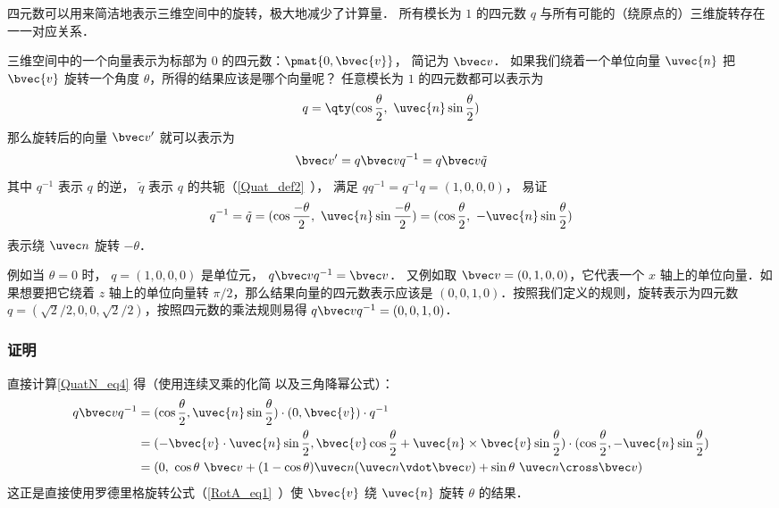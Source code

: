 

四元数可以用来简洁地表示三维空间中的旋转，极大地减少了计算量． 所有模长为 $1$ 的四元数 $q$ 与所有可能的（绕原点的）三维旋转存在一一对应关系．

三维空间中的一个向量表示为标部为 $0$ 的四元数：$\pmat{0, \bvec{v}}$， 简记为 $\bvec v$． 如果我们绕着一个单位向量 ${\uvec{n}}$ 把 $\bvec{v}$ 旋转一个角度 $\theta$，所得的结果应该是哪个向量呢？ 任意模长为 $1$ 的四元数都可以表示为
\begin{equation}
q = \qty(\cos{\frac{\theta}{2}},\ {\uvec{n}}\sin{\frac{\theta}{2}})
\end{equation}
那么旋转后的向量 $\bvec v'$ 就可以表示为
\begin{equation}\label{QuatN_eq4}
\bvec v' = q\bvec vq^{-1} = q\bvec v \tilde q
\end{equation}
其中 $q^{-1}$ 表示 $q$ 的逆， $\tilde q$ 表示 $q$ 的共轭（\autoref{Quat_def2}~）， 满足 $qq^{-1} = q^{-1}q = (1,0,0,0)$， 易证
\begin{equation}
q^{-1} = \tilde q = (\cos{\frac{-\theta}{2}},\ {\uvec{n}}\sin{\frac{-\theta}{2}})
= (\cos{\frac{\theta}{2}},\ -{\uvec{n}}\sin{\frac{\theta}{2}})
\end{equation}
表示绕 $\uvec n$ 旋转 $-\theta$．

例如当 $\theta = 0$ 时， $q = (1,0,0,0)$ 是单位元， $q\bvec vq^{-1} = \bvec v$． 又例如取 $\bvec v = (0, 1, 0, 0)$，它代表一个 $x$ 轴上的单位向量．如果想要把它绕着 $z$ 轴上的单位向量转 $\pi/2$，那么结果向量的四元数表示应该是 $(0, 0, 1, 0)$．按照我们定义的规则，旋转表示为四元数 $q=(\sqrt{2}/2, 0, 0, \sqrt{2}/2)$，按照四元数的乘法规则易得 $q\bvec v q^{-1}=(0,0,1,0)$．

\subsubsection{证明}
直接计算\autoref{QuatN_eq4} 得（使用连续叉乘的化简 以及三角降幂公式）：
\begin{equation}
\begin{aligned}
q\bvec vq^{-1}&= (\cos{\frac{\theta}{2}}, {\uvec{n}}\sin{\frac{\theta}{2}})\cdot (0, \bvec{v})\cdot q^{-1}\\&
=(-\bvec{v}\cdot {\uvec{n}}\sin{\frac{\theta}{2}}, \bvec{v}\cos{\frac{\theta}{2}}+ {\uvec{n}}\times\bvec{v}\sin{\frac{\theta}{2}})\cdot (\cos{\frac{\theta}{2}}, -{\uvec{n}}\sin{\frac{\theta}{2}})\\&
= (0,\ \cos\theta\ \bvec v + (1-\cos\theta)\uvec n(\uvec n\vdot \bvec v) + \sin\theta\ \uvec n\cross\bvec v)
\end{aligned}
\end{equation}
这正是直接使用罗德里格旋转公式（\autoref{RotA_eq1}~）使 $\bvec{v}$ 绕 ${\uvec{n}}$ 旋转 $\theta$ 的结果．

